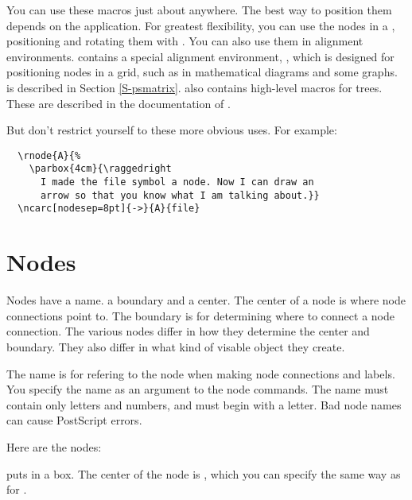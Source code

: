 \documentclass[11pt,english,BCOR10mm,DIV12,bibliography=totoc,parskip=false,smallheadings
    headexclude,footexclude,oneside]{pst-doc}
\begin{document}
You can use these macros just about anywhere. The best way to position them
depends on the application. For greatest flexibility, you can use the nodes in
a , positioning and rotating them with . You can also use
them in alignment environments.  contains a special alignment
environment, , which is designed for positioning nodes in a grid,
such as in mathematical diagrams and some graphs.  is described in
Section \ref{S-psmatrix}.  also contains high-level macros for
trees. These are described in the documentation of .

But don't restrict yourself to these more obvious uses. For example:
\begin{center}
\end{center}

\begin{lstlisting}
  \rnode{A}{%
    \parbox{4cm}{\raggedright
      I made the file symbol a node. Now I can draw an
      arrow so that you know what I am talking about.}}
  \ncarc[nodesep=8pt]{->}{A}{file}
\end{lstlisting}

\section{Nodes}\label{S-nodes}

Nodes have a name. a boundary and a center.
The center of a node is where node connections point to. The boundary is for
determining where to connect a node connection. The various nodes differ in
how they determine the center and boundary. They also differ in what kind of
visable object they create.


The\XInfoDanger[0]{} name is for refering to the node when making node connections and labels.
You specify the name as an argument to the node commands. The name must
contain only letters and numbers, and must begin with a letter. Bad node names
can cause PostScript errors.


Here are the nodes:

\begin{BDef}
\end{BDef}

   puts  in a box. The center of the node is , which
you can specify the same way as for .
\end{document}
